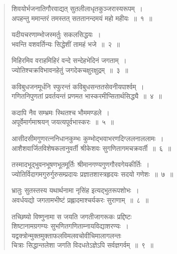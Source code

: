 \documentclass[11pt, openany]{book}
\begin{document}
\begin{quote}
{\color{violet}शिवयोर्भजनातिगौरवाद्यत् सुतलीलाधृतकुञ्जरास्यरूपम्~।\\
अपहन्तु ममान्तरं तमस्तत् सततानन्दमयं महो महीयः~॥~१~॥}
\vspace{1mm}

{\color{violet}यदीयचरणाम्भोजस्मर्तुः सकलसिद्धयः~।\\
भवन्ति वशवर्तिन्यः सिद्धेशीं तामहं भजे~॥~२~॥ }
\vspace{1mm}

{\color{violet}मिहिरमिव वराहमिहिरं वन्दे सन्देहभेदिनं जगताम्~।\\
ज्योतिश्चक्रविभावनहेतुं जगदेकचक्षुरक्षुद्रम्~॥~३~॥}
\vspace{1mm}

{\color{violet}कविबुधजनमूर्धनि स्फुरन्तं कविबुधसन्ततसेवनीयपार्श्वम्~।\\
गणितनिपुणतां प्रवर्तयन्तं प्रणमत भास्करमीप्सितार्थसिद्ध्यै~॥~४~॥}
\vspace{1mm}

{\color{violet}कदापि नैव सम्भ्रमः स्थितश्च भौममण्डले~।\\
अपूर्वेमार्गमाश्रयन् जयत्यपूर्वभास्करः~॥~५~॥}
\vspace{1mm}

{\color{violet}आसीदसीमगुणरत्ननिधानकुम्भः कुम्भोद्भवाभरणदिग्ललनाललामः~।\\
आशैशवार्जितविशेषकलानुवर्ती श्रीकेशवः सुगणितागमचक्रवर्ती~॥~६~॥}
\vspace{1mm}

{\color{violet}तस्मादभूद्भुवनभूषणभूतमूर्तिः श्रीमानगण्यगुणगौरवगेयकीर्तिः~। \\
ज्योतिर्विदागमगुरुर्गुरुसम्प्रदायः प्रज्ञातशास्त्रहृदयः सदयो गणेशः~॥~७~॥}
\vspace{1mm}

{\color{violet}भ्रातुः सुतस्तस्य यथार्थनामा नृसिंह इत्यद्भुतरूपशोभः~। \\
अवर्धयद्यो जगतामभीष्टं प्रह्लादमाश्चर्यकरः सुराणाम्~॥~८~॥}
\vspace{1mm}

{\color{violet}तच्छिष्यो विष्णुनामा स जयति जगतीजागरूकः प्रद्दिष्टः \\
शिष्टानामग्रगण्यः सुभणितगणिताम्नायविद्याशरण्यः~।\\
यद्वक्त्रोन्मुक्तमुक्ताफलविमलवचोवीचिमालागलन्तः\\    
चित्राः सिद्धान्तलेशा जगति विदधतेऽज्ञेऽपि सर्वज्ञगर्वम्~॥~९~॥}
\end{quote}

\afterpage{\fancyhead[RE,LO]{{\small{}}}}
\afterpage{\fancyhead[LE,RO]{{\small{\textbf{\thepage}}}}}
\cfoot{}
\end{document}
